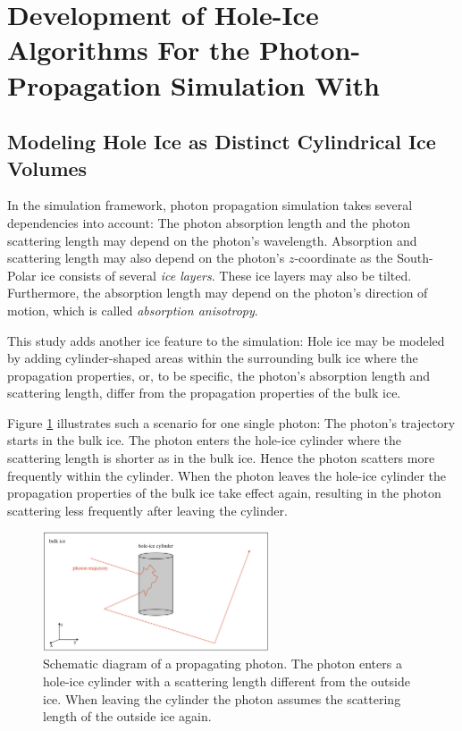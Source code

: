 
\section{Development of Hole-Ice Algorithms For the Photon-Propagation Simulation With \clsim}
\label{sec:methods}\renewcommand\currentsection{Hole-Ice Algorithms}

\subsection{Modeling Hole Ice as Distinct Cylindrical Ice Volumes}

In the \icecube simulation framework, photon propagation simulation takes several dependencies into account: The photon absorption length and the photon scattering length may depend on the photon's wavelength. Absorption and scattering length may also depend on the photon's $z$-coordinate as the South-Polar ice consists of several \textit{ice layers}. These ice layers may also be tilted. Furthermore, the absorption length may depend on the photon's direction of motion, which is called \textit{absorption anisotropy}.

This study adds another ice feature to the simulation: Hole ice may be modeled by adding cylinder-shaped areas within the surrounding bulk ice where the propagation properties, or, to be specific, the photon's absorption length and scattering length, differ from the propagation properties of the bulk ice.

Figure \ref{fig:aiw2Thah} illustrates such a scenario for one single photon: The photon's trajectory starts in the bulk ice. The photon enters the hole-ice cylinder where the scattering length is shorter as in the bulk ice. Hence the photon scatters more frequently within the cylinder. When the photon leaves the hole-ice cylinder the propagation properties of the bulk ice take effect again, resulting in the photon scattering less frequently after leaving the cylinder.

\begin{figure}[htb]
  \centering
  \includegraphics[width=0.6\textwidth]{img/hole-ice-as-cylinder-shaped-areas}
  \caption{Schematic diagram of a propagating photon. The photon enters a hole-ice cylinder with a scattering length different from the outside ice. When leaving the cylinder the photon assumes the scattering length of the outside ice again.}
  \label{fig:aiw2Thah}
\end{figure}


